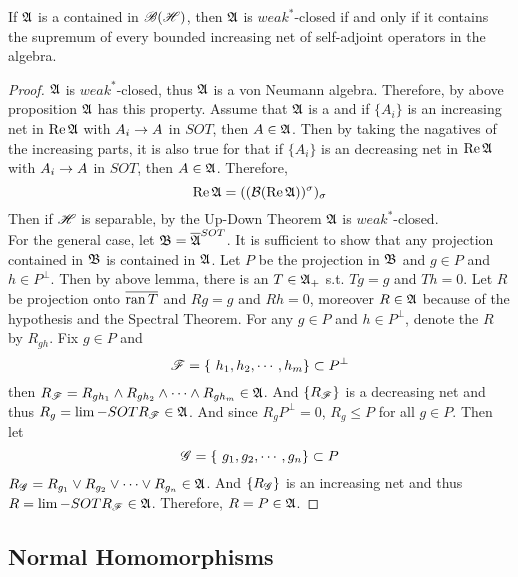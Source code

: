 \begin{thm}
	If $\mathfrak{A}$ is a \Cs contained in $\mathscr{B(H)}$, then $\mathfrak{A}$ is $weak^*$-closed if and only if it contains the supremum of every bounded increasing net of self-adjoint operators in the algebra.
\end{thm}
\begin{proof}
	$\mathfrak{A}$ is $weak^*$-closed, thus $\mathfrak{A}$ is  a von Neumann algebra. Therefore, by above proposition $\mathfrak{A}$ has this property. Assume that $\mathfrak{A}$ is a \Cs and if $\{A_i\}$ is an increasing net in $\operatorname{Re}{\mathfrak{A}}$ with $A_i \rightarrow A$ in $SOT$, then $A \in \mathfrak{A}$. Then by taking the nagatives of the increasing parts, it is also true for that if $\{A_i\}$ is an decreasing net in $\operatorname{Re}{\mathfrak{A}}$ with $A_i \rightarrow A$ in $SOT$, then $A \in \mathfrak{A}$. Therefore, 
	\begin{equation*}
		\operatorname{Re}{\mathfrak{A}} = ((\mathcal{B}(\operatorname{Re}{\mathfrak{A}}))^{\sigma})_{\sigma}
	\end{equation*}
	Then if $\mathscr{H}$ is separable, by the Up-Down Theorem $\mathfrak{A}$ is $weak^*$-closed. \\
	For the general case, let $\mathfrak{B} = \overline{\mathfrak{A}}^{SOT}$. It is sufficient to show that any projection contained in $\mathfrak{B}$ is contained in $\mathfrak{A}$. Let $P$ be the projection in $\mathfrak{B}$ and $g \in P$ and $h \in P^{\bot}$. Then by above lemma, there is an $T \in \mathfrak{A}_+$ s.t. $Tg = g$ and $Th = 0$. Let $R$ be projection onto $\overline{\operatorname{ran}{T}}$ and $Rg = g$ and $Rh = 0$, moreover $R \in \mathfrak{A}$ because of the hypothesis and the Spectral Theorem. For any $g \in P$ and $h \in P^{\bot}$, denote the $R$ by $R_{gh}$. Fix $g \in P$ and 
	\begin{equation*}
		\mathscr{F} = \{~h_1, h_2, \cdots, h_m\} \subset P^{\bot}
	\end{equation*}
	then $R_{\mathscr{F}} = R_{gh_1} \wedge R_{gh_2} \wedge \cdots \wedge R_{gh_m} \in \mathfrak{A}$. And $\{R_{\mathscr{F}}\}$ is a decreasing net and thus $R_g = \lim-SOT R_{\mathscr{F}} \in \mathfrak{A}$. And since $R_g P^{\bot} = 0$, $R_g \leqslant P$ for all $g \in P$. Then let
	\begin{equation*}
		\mathscr{G} = \{~g_1, g_2, \cdots, g_n\} \subset P
	\end{equation*}
	$R_{\mathscr{G}} = R_{g_1} \vee R_{g_2} \vee \cdots \vee R_{g_n} \in \mathfrak{A}$. And $\{R_{\mathscr{G}}\}$ is an increasing net and thus $R = \lim-SOT R_{\mathscr{F}} \in \mathfrak{A}$. Therefore, $R = P \in \mathfrak{A}$.
\end{proof}

\subsection{Normal Homomorphisms}

